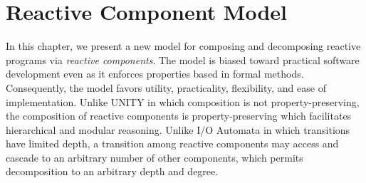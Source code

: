 \chapter{Reactive Component Model \label{model}}

In this chapter, we present a new model for composing and decomposing reactive programs via \emph{reactive components}.
The model is biased toward practical software development even as it enforces properties based in formal methods.
Consequently, the model favors utility, practicality, flexibility, and ease of implementation.
Unlike UNITY in which composition is not property-preserving, the composition of reactive components is property-preserving which facilitates hierarchical and modular reasoning.
Unlike I/O Automata in which transitions have limited depth, a transition among reactive components may access and cascade to an arbitrary number of other components, which permits decomposition to an arbitrary depth and degree.



